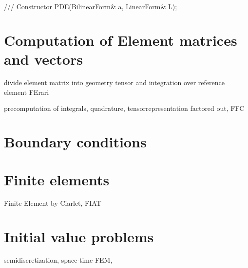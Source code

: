 \begin{code}
/// Constructor
PDE(BilinearForm& a, LinearForm& L);
\end{code}

\section{Computation of Element matrices and vectors} 

divide element matrix into geometry tensor and integration 
over reference element FErari

precomputation of integrals, quadrature, tensorrepresentation factored out, FFC 

\section{Boundary conditions}

\section{Finite elements}

Finite Element by Ciarlet, FIAT 

\section{Initial value problems}

semidiscretization, space-time FEM, 

